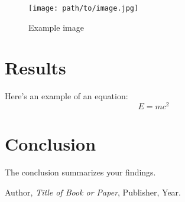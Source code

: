 \documentclass[a4paper,12pt]{article} %
\begin{document}
\begin{figure}[h]
    \centering
    \texttt{[image: path/to/image.jpg]} %
    \caption{Example image}
    \label{fig:example_image}
\end{figure}

\section{Results}
Here’s an example of an equation:
\begin{equation}
    E = mc^2
\end{equation}

\section{Conclusion}
The conclusion summarizes your findings. \lipsum[6]

\newpage
\begin{thebibliography}{9}
     Author, \textit{Title of Book or Paper}, Publisher, Year.
\end{thebibliography}
\end{document}
